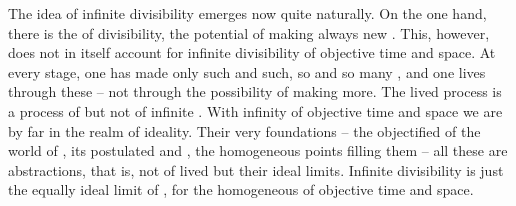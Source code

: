 The idea of infinite divisibility emerges now quite naturally. On the one hand,
there is the  of divisibility, the potential of making always new
. This, however, does not in itself account for infinite
divisibility of objective time and space.  At every stage, one has made only
such and such, so and so many , and one lives through these --
not through the possibility of making more. The lived process is a process of
 but not of infinite .  With infinity
of objective time and space we are by far in the realm of ideality.  Their very
foundations -- the {objectified}  of the world of , its
postulated  and , the homogeneous points filling them -- all
these are  abstractions, that is, not  of lived
 but their ideal limits.  Infinite divisibility is just the
equally ideal limit of ,  for the homogeneous
 of objective time and space.

